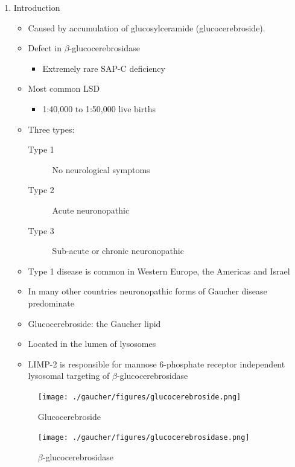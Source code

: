 \documentclass{scrartcl}
\begin{document}
\begin{enumerate}
\item Introduction
\label{sec:orgdbe2675}
\begin{itemize}
\item Caused by accumulation of glucosylceramide (glucocerebroside).
\item Defect in \(\beta\)-glucocerebrosidase
\begin{itemize}
\item Extremely rare SAP-C deficiency
\end{itemize}
\item Most common LSD
\begin{itemize}
\item 1:40,000 to 1:50,000 live births
\end{itemize}
\item Three types:
\begin{description}
\item[{Type 1}] No neurological symptoms
\item[{Type 2}] Acute neuronopathic
\item[{Type 3}] Sub-acute or chronic neuronopathic
\end{description}
\item Type 1 disease is common in Western Europe, the Americas and Israel
\item In many other countries neuronopathic forms of Gaucher disease predominate
\item Glucocerebroside: the Gaucher lipid

\item Located in the lumen of lysosomes
\item LIMP-2 is responsible for mannose 6-phosphate receptor independent
lysosomal targeting of \(\beta\)-glucocerebrosidase
\end{itemize}

\begin{figure}[htbp]
\centering
\texttt{[image: ./gaucher/figures/glucocerebroside.png]}
\caption{\label{fig:org722f235}
Glucocerebroside}
\end{figure}

\begin{figure}[htbp]
\centering
\texttt{[image: ./gaucher/figures/glucocerebrosidase.png]}
\caption{\label{fig:org9edd2cd}
\(\beta\)-glucocerebrosidase}
\end{figure}


\end{enumerate}
\end{document}
